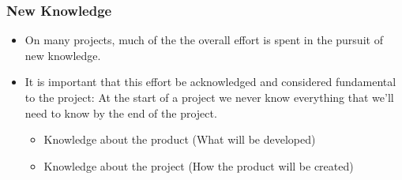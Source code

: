 \hypertarget{new-knowledge}{%
\subsubsection{New Knowledge}\label{new-knowledge}}

\begin{itemize}
\tightlist
\item
  On many projects, much of the the overall effort is spent in the
  pursuit of new knowledge.
\item
  It is important that this effort be acknowledged and considered
  fundamental to the project: At the start of a project we never know
  everything that we'll need to know by the end of the project.

  \begin{itemize}
  \tightlist
  \item
    Knowledge about the product (What will be developed)
  \item
    Knowledge about the project (How the product will be created)
  \end{itemize}
\end{itemize}




\clearpage